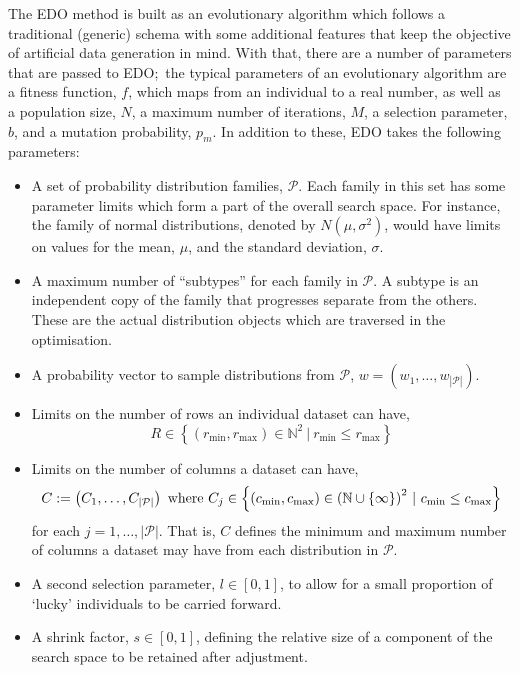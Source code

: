 \documentclass[smallextended]{svjour3}
\begin{document}
The EDO method is built as an evolutionary algorithm which follows a traditional
(generic) schema with some additional features that keep the objective of
artificial data generation in mind. With that, there are a number of parameters
that are passed to EDO;\ the typical parameters of an evolutionary algorithm
are a fitness function, \(f\), which maps from an individual to a real number,
as well as a population size, \(N\), a maximum number of iterations, \(M\), a
selection parameter, \(b\), and a  mutation probability, \(p_m\). In addition to
these, EDO takes the following parameters:
\begin{itemize}
    \item A set of probability distribution families, \(\mathcal{P}\). Each
        family in this set has some parameter limits which form a part of the
        overall search space. For instance, the family of normal distributions,
        denoted by \(N(\mu, \sigma^2)\), would have limits on values for the
        mean, \(\mu\), and the standard deviation, \(\sigma\).
    \item A maximum number of ``subtypes'' for each family in \(\mathcal{P}\). A
        subtype is an independent copy of the family that progresses separate
        from the others. These are the actual distribution objects which are
        traversed in the optimisation.
    \item A probability vector to sample distributions from \(\mathcal{P}\),
        \(w = \left(w_1, \ldots, w_{|\mathcal{P}|}\right)\).
    \item Limits on the number of rows an individual dataset can have,
        \[
            R \in \left\{%
                (r_{\min}, r_{\max}) \in \mathbb{N}^2~|~r_{\min} \leq r_{\max}
            \right\}
        \]
    \item Limits on the number of columns a dataset can have,
        \[
            C := \left(C_1, \ldots, C_{|\mathcal{P}|}\right)
            \text{ where }
            C_j \in \left\{ (c_{\min}, c_{\max}) \in {%
                \left(\mathbb{N}\cup\{\infty\}\right)
            }^2~|~c_{\min} \leq c_{\max}\right\}
        \]
        for each \(j = 1, \ldots, |\mathcal{P}|\). That is, \(C\) defines the
        minimum and maximum number of columns a dataset may have from each
        distribution in \(\mathcal{P}\).
    \item A second selection parameter, \(l \in [0, 1]\), to allow for a
        small proportion of `lucky' individuals to be carried forward.
    \item A shrink factor, \(s \in [0, 1]\), defining the relative size of a
        component of the search space to be retained after adjustment.
\end{itemize}
\end{document}

